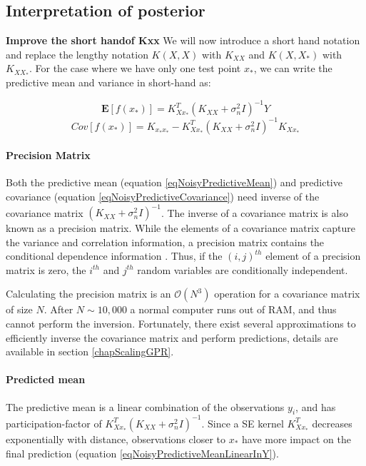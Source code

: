 \subsection{Interpretation of posterior}
\textbf{Improve the short handof Kxx}
We will now introduce a short hand notation and replace the lengthy notation $K(X, X)$ with $K_{XX}$ and $K(X, X_{*})$ with $K_{XX_{*}}$. For the case where we have only one test point $x_{*}$, we can write the predictive mean and variance in short-hand as:

  \begin{equation}\label{eqNoisyPredictiveMean}
  \mathbf{E}[f(x_{*})] = K_{Xx_{*}}^{T}( K_{XX} + \sigma^{2}_{n}I)^{-1}Y
  \end{equation}
  \begin{equation}\label{eqNoisyPredictiveCovariance}
	Cov[f(x_{*})] = K_{x_{*}x_{*}} - K_{Xx_{*}}^{T}( K_{XX} + \sigma^{2}_{n}I )^{-1} K_{Xx_{*}}
  \end{equation}

\paragraph{Precision Matrix}  
Both the predictive mean (equation \ref{eqNoisyPredictiveMean}) and predictive covariance (equation \ref{eqNoisyPredictiveCovariance}) need inverse of the covariance matrix $( K_{XX} + \sigma^{2}_{n}I)^{-1}$. The inverse of a covariance matrix is also known as a precision matrix. While the elements of a covariance matrix capture the variance and correlation information, a precision matrix contains the conditional dependence information \cite{mackay2003information}. Thus, if the $(i, j)^{th}$ element of a precision matrix is zero, the $i^{th}$ and $j^{th}$ random variables are conditionally independent. 

Calculating the precision matrix is an $\mathcal{O}\left ( N^{3} \right )$ operation for a covariance matrix of size $N$. After $N \sim 10,000$ a normal computer runs out of RAM, and thus cannot perform the inversion. Fortunately, there exist several approximations to efficiently inverse the covariance matrix and perform predictions, details are available in section \ref{chapScalingGPR}.

\paragraph{Predicted mean}
The predictive mean is a linear combination of the observations $y_{i}$, and has participation-factor of $K_{Xx_{*}}^{T}( K_{XX} + \sigma^{2}_{n}I)^{-1}$. Since a SE kernel $K_{Xx_{*}}^{T}$ decreases exponentially with distance, observations closer to $x_{*}$ have more impact on the final prediction (equation \ref{eqNoisyPredictiveMeanLinearInY}). 
  
